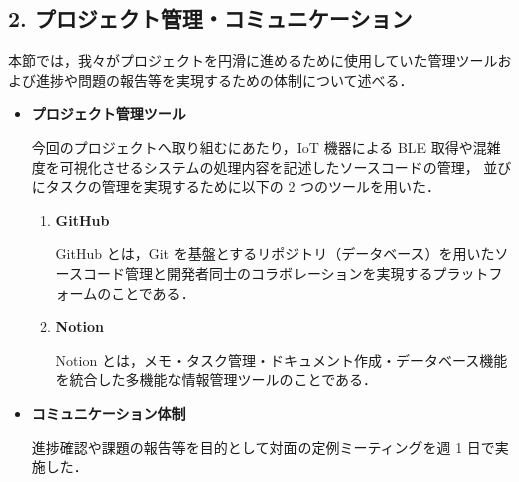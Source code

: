 \subsection*{2. プロジェクト管理・コミュニケーション}

本節では，我々がプロジェクトを円滑に進めるために使用していた管理ツールおよび進捗や問題の報告等を実現するための体制について述べる．
\begin{itemize}
	\item \textbf{プロジェクト管理ツール}
	
	今回のプロジェクトへ取り組むにあたり，IoT 機器による BLE 取得や混雑度を可視化させるシステムの処理内容を記述したソースコードの管理，
	並びにタスクの管理を実現するために以下の 2 つのツールを用いた．
	
	\begin{enumerate}
		\item \textbf{GitHub}
		
		GitHub とは，Git\cite{Git} を基盤とするリポジトリ（データベース）を用いたソースコード管理と開発者同士のコラボレーションを実現するプラットフォームのことである\cite{GitHub}．
		
		\item \textbf{Notion}
		
		Notion とは，メモ・タスク管理・ドキュメント作成・データベース機能を統合した多機能な情報管理ツールのことである\cite{Notion}．
		
	\end{enumerate}
	
	\item \textbf{コミュニケーション体制}
	
	進捗確認や課題の報告等を目的として対面の定例ミーティングを週 1 日で実施した．
\end{itemize}

